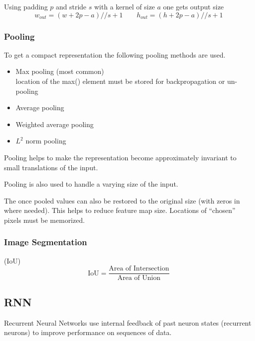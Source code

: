 Using padding $p$ and stride $s$ with a kernel of size $a$ one gets output size
\begin{equation*}
    w_{out}= (w+2p-a)//s + 1 \qquad
    h_{out}= (h+2p-a)//s + 1
\end{equation*}


\subsubsection{Pooling}
To get a compact representation the following pooling methods are used.
\begin{itemize}
    \item Max pooling (most common)
          \\ location of the max() element must be stored for backpropagation or un-pooling
    \item Average pooling
    \item Weighted average pooling
    \item $L^2$ norm pooling
\end{itemize}

Pooling helps to make the representation become approximately invariant to small translations of the input.

Pooling is also used to handle a varying size of the input.

\newpar{}

The once pooled values can also be restored to the original size (with zeros in where needed). This helps to reduce feature map size. Locations of ``chosen'' pixels must be memorized.

\subsubsection{Image Segmentation}

 (IoU)
\begin{equation*}
    \text{IoU} = \frac{\text{Area of Intersection}}{\text{Area of Union}}
\end{equation*}


\subsection{RNN}\label{sec:RNN}
Recurrent Neural Networks use internal feedback of past neuron states (recurrent neurons) to improve performance on sequences of data.

